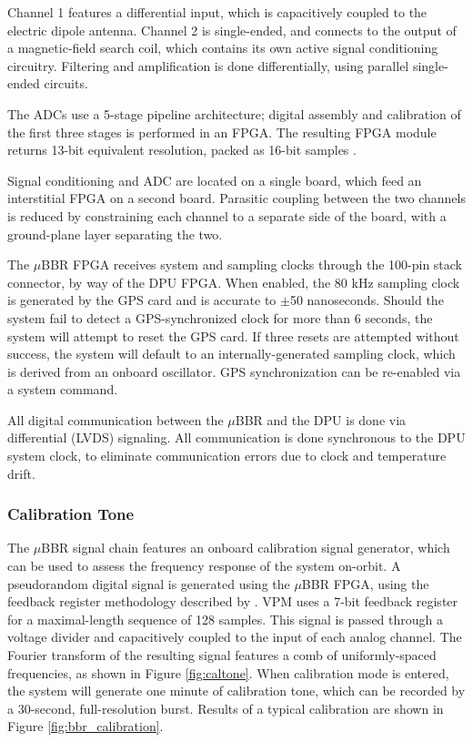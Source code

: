 Channel 1 features a differential input, which is capacitively coupled to the electric dipole antenna. Channel 2 is single-ended, and connects to the output of a magnetic-field search coil, which contains its own active signal conditioning circuitry. Filtering and amplification is done differentially, using parallel single-ended circuits. 

The ADCs use a 5-stage pipeline architecture; digital assembly and calibration of the first three stages is performed in an FPGA. The resulting FPGA module returns 13-bit equivalent resolution, packed as 16-bit samples \citep{Wang2009}. 

Signal conditioning and ADC are located on a single board, which feed an interstitial FPGA on a second board. Parasitic coupling between the two channels is reduced by constraining each channel to a separate side of the board, with a ground-plane layer separating the two. 

The $\mu$BBR FPGA receives system and sampling clocks through the 100-pin stack connector, by way of the DPU FPGA. When enabled, the 80 kHz sampling clock is generated by the GPS card and is accurate to $\pm$50 nanoseconds. Should the system fail to detect a GPS-synchronized clock for more than 6 seconds, the system will attempt to reset the GPS card. If three resets are attempted without success, the system will default to an internally-generated sampling clock, which is derived from an onboard oscillator. GPS synchronization can be re-enabled via a system command.

All digital communication between the $\mu$BBR and the DPU is done via differential (LVDS) signaling. All communication is done synchronous to the DPU system clock, to eliminate communication errors due to clock and temperature drift.


 \subsubsection{Calibration Tone}
The $\mu$BBR signal chain features an onboard calibration signal generator, which can be used to assess the frequency response of the system on-orbit. A pseudorandom digital signal is generated using the $\mu$BBR FPGA, using the feedback register methodology described by \cite{Paschal2005}. VPM uses a 7-bit feedback register for a maximal-length sequence of 128 samples. This signal is passed through a voltage divider and capacitively coupled to the input of each analog channel. The Fourier transform of the resulting signal features a comb of uniformly-spaced frequencies, as shown in Figure \ref{fig:caltone}. When calibration mode is entered, the system will generate one minute of calibration tone, which can be recorded by a 30-second, full-resolution burst. Results of a typical calibration are shown in Figure \ref{fig:bbr_calibration}.

